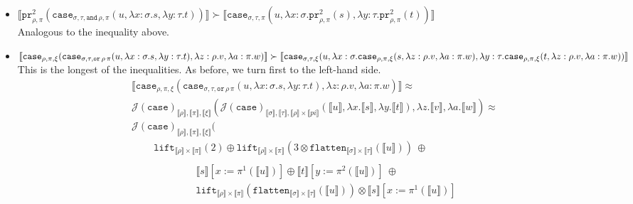 \documentclass[a4paper,UKenglish,cleveref,autoref,numberwithinsect]{lipics-v2019}
\theoremstyle{definition}
\newcommand{\abs}[2]{\lambda #1.#2}
\newcommand{\flatten}{\mathtt{flatten}}
\newcommand{\lift}{\mathtt{lift}}
\newcommand{\typeinterpret}[1]{\llbracket #1 \rrbracket}
\newcommand{\interpret}[1]{\llbracket #1 \rrbracket}
\newcommand{\proj}{\mathtt{pr}}
\begin{document}
\begin{itemize}
\item $\interpret{\proj^2_{\rho,\pi}(\mathtt{case}_{\sigma,\tau,
  \mathtt{and}\,\rho,\pi}(u,\abs{x:\sigma}{s},\abs{y:\tau}{t}))}
  \succ \interpret{\mathtt{case}_{\sigma,\tau,\pi}(u,\abs{x:
  \sigma}{\proj^2_{\rho,\pi}(s)},\abs{y:\tau}{\proj^2_{\rho,\pi}(t)})}$ \\
  Analogous to the inequality above.

\item $\interpret{\mathtt{case}_{\rho,\pi,\xi}(\mathtt{case}_{\sigma,
  \tau,\mathtt{or}\,\rho\,\pi}(u,\abs{x:\sigma}{s},\abs{y:\tau}{t}),
  \abs{z:\rho}{v},\abs{a:\pi}{w})} \succ \\
  \interpret{\mathtt{case}_{\sigma,\tau,\xi}(u,\abs{x:\sigma}{
  \mathtt{case}_{\rho,\pi,\xi}(s,\abs{z:\rho}{v},\abs{a:\pi}{w})},
  \abs{y:\tau}{\mathtt{case}_{\rho,\pi,\xi}(t,\abs{z:\rho}{v},\abs{a:
  \pi}{w})})}$ \\
  This is the longest of the inequalities.  As before, we turn first
  to the left-hand side.
  \[
  \begin{array}{l}
  \interpret{\mathtt{case}_{\rho,\pi,\xi}(\mathtt{case}_{\sigma,
  \tau,\mathtt{or}\,\rho\,\pi}(u,\abs{x:\sigma}{s},\abs{y:\tau}{t}),
  \abs{z:\rho}{v},\abs{a:\pi}{w})} \approx \\
  \mathcal{J}(\mathtt{case})_{\typeinterpret{\rho},\typeinterpret{\pi},
    \typeinterpret{\xi}}(
    \mathcal{J}(\mathtt{case})_{\typeinterpret{\sigma},
    \typeinterpret{\tau},\typeinterpret{\rho} \times
    \typeinterpret{pi}}(\interpret{u},\abs{x}{\interpret{s}},
    \abs{y}{\interpret{t}}),\abs{z}{\interpret{v}},
    \abs{a}{\interpret{w}}) \approx \\
  \mathcal{J}(\mathtt{case})_{\typeinterpret{\rho},
    \typeinterpret{\pi},\typeinterpret{\xi}}( \\
  \phantom{ABC}
    \lift_{\typeinterpret{\rho} \times \typeinterpret{\pi}}(2) \oplus
    \lift_{\typeinterpret{\rho} \times \typeinterpret{\pi}}(3 \otimes
      \flatten_{\typeinterpret{\sigma} \times \typeinterpret{\tau}}(
      \interpret{u}))\ \oplus \\
  \end{array}
  \]
  \[
  \begin{array}{l}
  \phantom{ABC}
    \interpret{s}[x:=\pi^1(\interpret{u})] \oplus
    \interpret{t}[y:=\pi^2(\interpret{u})]\ \oplus \\
  \phantom{ABC}
    \lift_{\typeinterpret{\rho} \times \typeinterpret{\pi}}(
      \flatten_{\typeinterpret{\sigma} \times \typeinterpret{\tau}}(
      \interpret{u})) \otimes \interpret{s}[x:=\pi^1(\interpret{u})]

\end{array}\]
\end{itemize}
\end{document}
